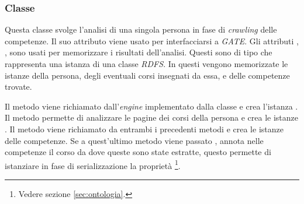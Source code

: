 \documentclass[tesi.tex]{subfiles}
\begin{document}
\subsubsection{Classe }
\begin{center}
\end{center}
Questa classe svolge l'analisi di una singola persona in fase di
\emph{crawling} delle competenze. Il suo attributo  viene
usato per interfacciarsi a \emph{GATE}. Gli attributi ,
,  sono usati per memorizzare i risultati dell'analisi. Questi sono di
tipo  che rappresenta una istanza di una
classe \emph{RDFS}. In questi vengono memorizzate le istanze della
persona, degli eventuali corsi insegnati da essa, e delle competenze
trovate.

Il metodo  viene richiamato dall'\emph{engine}
implementato dalla classe  e crea
l'istanza . Il metodo
 permette di analizzare le pagine dei corsi
della persona e crea le istanze . Il metodo
 viene richiamato da entrambi i
precedenti metodi e crea le istanze  delle competenze. Se a
quest'ultimo metodo viene passato , annota nelle
competenze il corso da dove queste sono state estratte, questo
permette di istanziare in fase di serializzazione la propriet\`a
\footnote{Vedere sezione \ref{sec:ontologia}.}.
\end{document}
